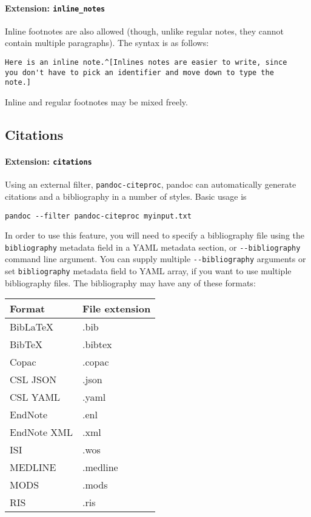 \documentclass[]{article}
\let\oldparagraph\paragraph
\renewcommand{\paragraph}[1]{\oldparagraph{#1}\mbox{}}
\begin{document}
\paragraph{\texorpdfstring{Extension:
\texttt{inline\_notes}}{Extension: inline\_notes}}\label{extension-inline_notes}

Inline footnotes are also allowed (though, unlike regular notes, they
cannot contain multiple paragraphs). The syntax is as follows:

\begin{verbatim}
Here is an inline note.^[Inlines notes are easier to write, since
you don't have to pick an identifier and move down to type the
note.]
\end{verbatim}

Inline and regular footnotes may be mixed freely.

\hypertarget{citations}{\subsection{Citations}\label{citations}}

\paragraph{\texorpdfstring{Extension:
\texttt{citations}}{Extension: citations}}\label{extension-citations}

Using an external filter, \texttt{pandoc-citeproc}, pandoc can
automatically generate citations and a bibliography in a number of
styles. Basic usage is

\begin{verbatim}
pandoc --filter pandoc-citeproc myinput.txt
\end{verbatim}

In order to use this feature, you will need to specify a bibliography
file using the \texttt{bibliography} metadata field in a YAML metadata
section, or \texttt{-\/-bibliography} command line argument. You can
supply multiple \texttt{-\/-bibliography} arguments or set
\texttt{bibliography} metadata field to YAML array, if you want to use
multiple bibliography files. The bibliography may have any of these
formats:

\begin{longtable}[]{@{}ll@{}}
\toprule
Format & File extension\tabularnewline
\midrule
\endhead
BibLaTeX & .bib\tabularnewline
BibTeX & .bibtex\tabularnewline
Copac & .copac\tabularnewline
CSL JSON & .json\tabularnewline
CSL YAML & .yaml\tabularnewline
EndNote & .enl\tabularnewline
EndNote XML & .xml\tabularnewline
ISI & .wos\tabularnewline
MEDLINE & .medline\tabularnewline
MODS & .mods\tabularnewline
RIS & .ris\tabularnewline
\bottomrule
\end{longtable}
\end{document}
